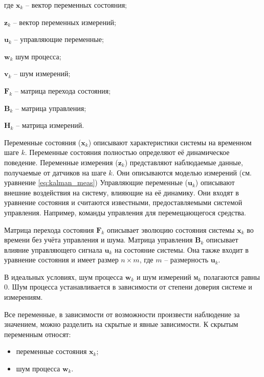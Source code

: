 \begin{explanationx}
	\item[где] \(\mathbf{x}_k\) -- вектор переменных состояния;
	\item \(\mathbf{z}_k\) -- вектор переменных измерений;
	\item \(\mathbf{u}_k\) -- управляющие переменные;
	\item \(\mathbf{w}_k\) шум процесса;
	\item \(\mathbf{v}_k \) -- шум измерений;
	\item \(\mathbf{F}_k\) -- матрица перехода состояния;
	\item \(\mathbf{B}_k\) -- матрица управления;
	\item \(\mathbf{H}_k\) -- матрица измерений.
\end{explanationx}

Переменные состояния (\(\mathbf{x}_k\)) описывают характеристики системы на временном шаге \( k \).
Переменные состояния полностью определяют её динамическое поведение.
Переменные измерения (\(\mathbf{z}_k\)) представляют наблюдаемые данные, получаемые от датчиков на шаге \( k \). 
Они описываются моделью измерений (см. уравнение \ref{eq:kalman_meas})
Управляющие переменные (\(\mathbf{u}_k\)) описывают внешние воздействия на систему, влияющие на её динамику.
Они входят в уравнение состояния и считаются известными, предоставляемыми системой управления.
Например, команды управления для перемещающегося средства.

Матрица перехода состояния \(\mathbf{F}_k\) описывает эволюцию состояния системы \(\mathbf{x}_k\) во времени без учёта управления и шума.
Матрица управления \(\mathbf{B}_k\) описывает влияние управляющего сигнала \(\mathbf{u}_k\) на состояние системы. Она также входит в уравнение состояния и имеет размер \(n \times m\), где \(m\) -- размерность \(\mathbf{u}_k\).

В идеальных условиях, шум процесса \(\mathbf{w}_k\) и шум измерений \(\mathbf{м}_k\)
полагаются равны 0. Шум процесса устанавливается в зависимости от степени
доверия системе и измерениям.

Все переменные, в зависимости от возможности произвести наблюдение за значением,
можно разделить на скрытые и явные зависимости.
К скрытым переменным относят:
\begin{itemize}
    \item переменные состояния $\mathbf{x}_k$; 
    \item шум процесса $\mathbf{w}_k$.
\end{itemize}

